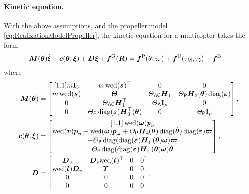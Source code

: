 \paragraph{Kinetic equation.}
With the above assumptions, and the propeller model \eqref{eq:RealizationModelPropeller}, the kinetic equation for a multicopter takes the form
\begin{align}\label{eq:RealizationMulticopterKinetics}
 \boldsymbol{M}(\boldsymbol{\theta_{}}) \dot{\boldsymbol{\xi}} + \boldsymbol{c}(\boldsymbol{\theta_{}}, \boldsymbol{\xi}) + \boldsymbol{D} \boldsymbol{\xi} + \boldsymbol{f}^{\mathrm{G}}(\boldsymbol{R}) &= \boldsymbol{f}^{\mathrm{P}}(\boldsymbol{\theta_{}}, \varpi_{}) + \boldsymbol{f}^{\mathrm{U}}(\tau_{\mathsf{M}}, \tau_{\mathsf{S}}) + \boldsymbol{f}^{\mathrm{B}}
\end{align}
where
\begin{subequations}\label{eq:RealizationMulticopterForces}
\allowdisplaybreaks
\begin{align}
 \sysInertiaMat(\tuple{\PropTilt}) &=
 \begin{bmatrix}[1.1]
  \m \idMat[3] & \m \wedOp(\bodyCOM{}{})^\top & 0 & 0 \\
  \m \wedOp(\bodyCOM{}{}) & \bodyMOI{}{}{} & \JAC \mat{H}_1 & \JP \mat{H}_3(\tuple{\PropTilt}) \diag(\tuple{\PropDir}) \\
  0 & \JAC \mat{H}_1^\top & \ArmInertia \idMat[\numProp] & 0 \\
  0 & \JP \diag(\tuple{\PropDir}) \mat{H}_3^\top(\tuple{\PropTilt}) & 0 & \PropInertia \idMat[\numProp]
 \end{bmatrix},
\\
 \gyroForce(\tuple{\PropTilt}, \sysVel) &= 
 \begin{bmatrix}[1.1]
  \wedOp(\w) \tuple{\genMomentumSym}_{\v} \\
  \wedOp(\v) \tuple{\genMomentumSym}_{\v} + \wedOp(\w) \tuple{\genMomentumSym}_{\w} + \JP \mat{H}_4(\tuple{\PropTilt}) \diag(\dot{\tuple{\PropTilt}}) \diag(\tuple{\PropDir}) \tuple{\PropVel} \\
  -\JP \diag( \diag(\tuple{\PropDir}) \mat{H}_4^\top(\tuple{\PropTilt}) \w) \tuple{\PropVel} \\
   \JP \diag( \diag(\tuple{\PropDir}) \mat{H}_4^\top(\tuple{\PropTilt}) \w) \dot{\tuple{\PropTilt}} \\
 \end{bmatrix},
\\
 \sysDissMat &= \begin{bmatrix} \mat{D}_v & \mat{D}_v \!\wedOp(\bodyCOD{}{})^\top\! & 0 & 0 \\ \wedOp(\bodyCOD{}{}) \mat{D}_v & \bodyMOD{}{}{} & 0 & 0 \\ 0 & 0 & 0 & 0 \\ 0 & 0 & 0 & 0 \end{bmatrix}\!,

\end{align}
\end{subequations}
